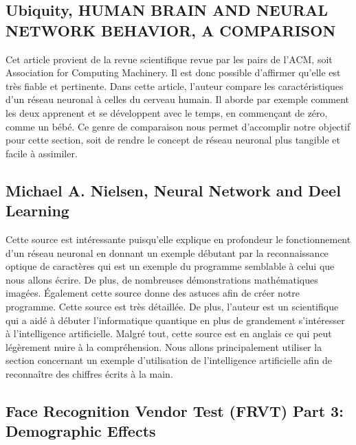 \documentclass[letterpaper,10pt,french]{sphinxmanual}
\begin{document}
\subsection{Ubiquity, HUMAN BRAIN AND NEURAL NETWORK BEHAVIOR, A COMPARISON}
\label{\detokenize{biblio_commented:ubiquity-human-brain-and-neural-network-behavior-a-comparison}}

Cet article provient de la revue scientifique revue par les pairs de l’ACM, soit Association for Computing Machinery.
Il est donc possible d’affirmer qu’elle est très fiable et pertinente. Dans cette article, l’auteur compare
les caractéristiques d’un réseau neuronal à celles du cerveau humain. Il aborde par exemple comment les deux apprenent et
se développent avec le temps, en commençant de zéro, comme un bébé. Ce genre de comparaison nous permet d’accomplir notre objectif
pour cette section, soit de rendre le concept de réseau neuronal plus tangible et facile à assimiler.


\subsection{Michael A. Nielsen, Neural Network and Deel Learning}
\label{\detokenize{biblio_commented:michael-a-nielsen-neural-network-and-deel-learning}}

Cette source est intéressante puisqu’elle explique en profondeur le fonctionnement
d’un réseau neuronal en donnant un exemple débutant par la reconnaissance optique
de caractères qui est un exemple du programme semblable à celui que nous allons
écrire. De plus, de nombreuses démonstrations mathématiques imagées. Également
cette source donne des astuces afin de créer notre programme. Cette source est
très détaillée. De plus, l’auteur est un scientifique qui a aidé à débuter
l’informatique quantique en plus de grandement s’intéresser à l’intelligence
artificielle. Malgré tout, cette source est en anglais ce qui peut
légèrement nuire à la compréhension. Nous allons principalement utiliser la
section concernant un exemple d’utilisation de l’intelligence
artificielle afin de reconnaître des chiffres écrits à la main.


\subsection{Face Recognition Vendor Test (FRVT) Part 3: Demographic Effects}
\label{\detokenize{biblio_commented:face-recognition-vendor-test-frvt-part-3-demographic-effects}}
\end{document}

